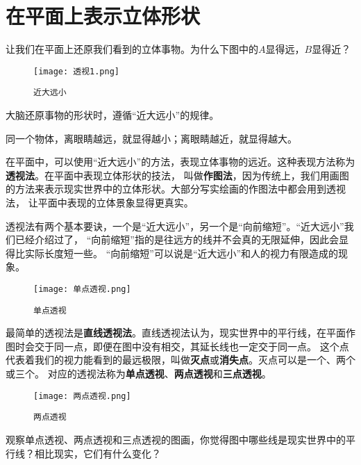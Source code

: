 \documentclass[12pt,UTF8]{ctexbook}
\begin{document}
\section{在平面上表示立体形状}

让我们在平面上还原我们看到的立体事物。为什么下图中的$A$显得远，$B$显得近？

\begin{figure}[h] %
    \centering
    \texttt{[image: 透视1.png]}
    \caption*{\texttt{近大远小}}
\end{figure}

大脑还原事物的形状时，遵循“近大远小”的规律。

同一个物体，离眼睛越远，就显得越小；离眼睛越近，就显得越大。

在平面中，可以使用“近大远小”的方法，表现立体事物的远近。这种表现方法称为\textbf{透视法}。在平面中表现立体形状的技法，
叫做\textbf{作图法}，因为传统上，我们用画图的方法来表示现实世界中的立体形状。大部分写实绘画的作图法中都会用到透视法，
让平面中表现的立体景象显得更真实。

透视法有两个基本要诀，一个是“近大远小”，另一个是“向前缩短”。“近大远小”我们已经介绍过了，
“向前缩短”指的是往远方的线并不会真的无限延伸，因此会显得比实际长度短一些。
“向前缩短”可以说是“近大远小”和人的视力有限造成的现象。

\begin{figure}[h] %
    \centering
    \texttt{[image: 单点透视.png]}
    \caption*{\texttt{单点透视}}
\end{figure}

最简单的透视法是\textbf{直线透视法}。直线透视法认为，现实世界中的平行线，在平面作图时会交于同一点，即便在图中没有相交，其延长线也一定交于同一点。
这个点代表着我们的视力能看到的最远极限，叫做\textbf{灭点}或\textbf{消失点}。灭点可以是一个、两个或三个。
对应的透视法称为\textbf{单点透视}、\textbf{两点透视}和\textbf{三点透视}。

\begin{figure}[h] %
    \vspace{-4pt}
    \centering
    \texttt{[image: 两点透视.png]}
    \caption*{\texttt{两点透视}}
\end{figure}

观察单点透视、两点透视和三点透视的图画，你觉得图中哪些线是现实世界中的平行线？相比现实，它们有什么变化？
\end{document}
